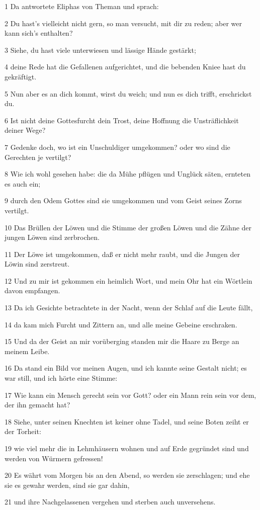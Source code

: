 \par 1 Da antwortete Eliphas von Theman und sprach:
\par 2 Du hast's vielleicht nicht gern, so man versucht, mit dir zu reden; aber wer kann sich's enthalten?
\par 3 Siehe, du hast viele unterwiesen und lässige Hände gestärkt;
\par 4 deine Rede hat die Gefallenen aufgerichtet, und die bebenden Kniee hast du gekräftigt.
\par 5 Nun aber es an dich kommt, wirst du weich; und nun es dich trifft, erschrickst du.
\par 6 Ist nicht deine Gottesfurcht dein Trost, deine Hoffnung die Unsträflichkeit deiner Wege?
\par 7 Gedenke doch, wo ist ein Unschuldiger umgekommen? oder wo sind die Gerechten je vertilgt?
\par 8 Wie ich wohl gesehen habe: die da Mühe pflügen und Unglück säten, ernteten es auch ein;
\par 9 durch den Odem Gottes sind sie umgekommen und vom Geist seines Zorns vertilgt.
\par 10 Das Brüllen der Löwen und die Stimme der großen Löwen und die Zähne der jungen Löwen sind zerbrochen.
\par 11 Der Löwe ist umgekommen, daß er nicht mehr raubt, und die Jungen der Löwin sind zerstreut.
\par 12 Und zu mir ist gekommen ein heimlich Wort, und mein Ohr hat ein Wörtlein davon empfangen.
\par 13 Da ich Gesichte betrachtete in der Nacht, wenn der Schlaf auf die Leute fällt,
\par 14 da kam mich Furcht und Zittern an, und alle meine Gebeine erschraken.
\par 15 Und da der Geist an mir vorüberging standen mir die Haare zu Berge an meinem Leibe.
\par 16 Da stand ein Bild vor meinen Augen, und ich kannte seine Gestalt nicht; es war still, und ich hörte eine Stimme:
\par 17 Wie kann ein Mensch gerecht sein vor Gott? oder ein Mann rein sein vor dem, der ihn gemacht hat?
\par 18 Siehe, unter seinen Knechten ist keiner ohne Tadel, und seine Boten zeiht er der Torheit:
\par 19 wie viel mehr die in Lehmhäusern wohnen und auf Erde gegründet sind und werden von Würmern gefressen!
\par 20 Es währt vom Morgen bis an den Abend, so werden sie zerschlagen; und ehe sie es gewahr werden, sind sie gar dahin,
\par 21 und ihre Nachgelassenen vergehen und sterben auch unversehens.

